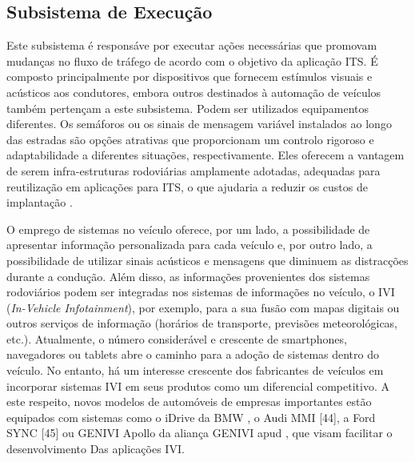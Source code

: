 \documentclass[
	12pt,				%
	oneside,			%
	a4paper,			%
	english,			%
	brazil				%
	]{abntex2ppgsi}
\begin{document}
\subsection{Subsistema de Execução}

Este subsistema é responsáve por executar ações necessárias que promovam mudanças no fluxo de tráfego de acordo com o objetivo da aplicação ITS. É composto principalmente por dispositivos que fornecem estímulos visuais e acústicos aos condutores, embora outros destinados à automação de veículos também pertençam a este subsistema. Podem ser utilizados equipamentos diferentes. Os semáforos ou os sinais de mensagem variável instalados ao longo das estradas são opções atrativas que proporcionam um controlo rigoroso e adaptabilidade a diferentes situações, respectivamente. Eles oferecem a vantagem de serem infra-estruturas rodoviárias amplamente adotadas, adequadas para reutilização em aplicações para ITS, o que ajudaria a reduzir os custos de implantação \cite{losilla2011comprehensive}. 

O emprego de sistemas no veículo oferece, por um lado, a possibilidade de apresentar informação personalizada para cada veículo e, por outro lado, a possibilidade de utilizar sinais acústicos e mensagens que diminuem as distracções durante a condução. Além disso, as informações provenientes dos sistemas rodoviários podem ser integradas nos sistemas de informações no veículo, o IVI (\textit{In-Vehicle Infotainment}), por exemplo, para a sua fusão com mapas digitais ou outros serviços de informação (horários de transporte, previsões meteorológicas, etc.). Atualmente, o número considerável e crescente de smartphones, navegadores ou tablets abre o caminho para a adoção de sistemas dentro do veículo. No entanto, há um interesse crescente dos fabricantes de veículos em incorporar sistemas IVI em seus produtos como um diferencial competitivo. A este respeito, novos modelos de automóveis de empresas importantes estão equipados com sistemas como o iDrive da BMW \cite{niedermaier2009new}, o Audi MMI [44], a Ford SYNC [45] ou GENIVI Apollo da aliança GENIVI apud  , que visam facilitar o desenvolvimento Das aplicações IVI.


\end{document}
